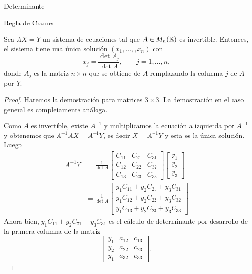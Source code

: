 \begin{chapter}{Determinante}
\begin{section}{Regla de Cramer}
  \begin{teorema} Sea $AX=Y$ un sistema de ecuaciones tal que $A \in M_n(\mathbb K)$ es invertible. Entonces, el sistema tiene una única solución $(x_1,\ldots,,x_n)$ con
      \begin{equation*}
          x_j = \frac{\det A_j}{\det A},\qquad j=1,\ldots,n,
      \end{equation*}
      donde $A_j$ es la matriz $n \times n$ que se obtiene de $A$ remplazando la columna $j$ de
      $A$ por $Y$.
  \end{teorema}
  \begin{proof}
      Haremos la demostración para matrices $3 \times 3$. La demostración en el caso general es completamente análoga.

      Como $A$  es invertible, existe $A^{-1}$ y multiplicamos la ecuación a izquierda por $A^{-1}$ y obtenemos que $A^{-1}A X = A^{-1}Y$,  es decir $X = A^{-1}Y$ y esta es la única solución. Luego
      \begin{align*}
          A^{-1}Y & = \frac{1}{\det A}
          \begin{bmatrix} C_{11} & C_{21} & C_{31} \\
                C_{12} & C_{22} & C_{32} \\
                C_{13} & C_{23} & C_{33}\end{bmatrix}
          \begin{bmatrix} y_1 \\ y_2 \\ y_3 \end{bmatrix}                                      \\
                  & = \frac{1}{\det A}\begin{bmatrix} y_1C_{11}+  y_2C_{21} + y_3C_{31}  \\
                                          y_1C_{12}+  y_2C_{22}+   y_3C_{32} \\
                                          y_1C_{13}+  y_2C_{23}+  y_3C_{33}\end{bmatrix} \tag{$*$}
      \end{align*}
      Ahora bien,  $y_1C_{11}+  y_2C_{21}+   y_3C_{31}$ es el cálculo de determinante por desarrollo de la primera columna de la matriz
      $$
          \begin{bmatrix}
              y_1 & a_{12} & a_{13} \\y_2 & a_{22} & a_{23} \\y_1 & a_{32} & a_{33}
          \end{bmatrix},
$$
\end{proof}
\end{section}
\end{chapter}
